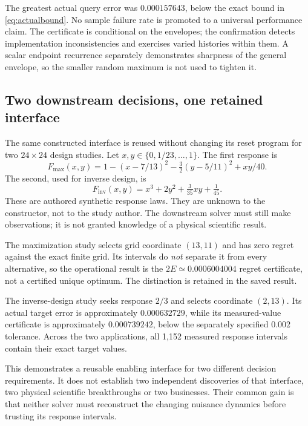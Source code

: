 \documentclass[11pt,letterpaper]{article}
\theoremstyle{definition}\newtheorem{definition}[theorem]{Definition}
\theoremstyle{remark}\newtheorem{remark}[theorem]{Remark}
\begin{document}
The greatest actual query error was $0.000157643$, below the exact bound in \eqref{eq:actualbound}. No sample failure rate is promoted to a universal performance claim. The certificate is conditional on the envelopes; the confirmation detects implementation inconsistencies and exercises varied histories within them. A scalar endpoint recurrence separately demonstrates sharpness of the general envelope, so the smaller random maximum is not used to tighten it.

\subsection{Two downstream decisions, one retained interface}
The same constructed interface is reused without changing its reset program for two $24\times24$ design studies. Let $x,y\in\{0,1/23,\ldots,1\}$. The first response is
\begin{equation}
 F_{\max}(x,y)=1-(x-7/13)^2-\tfrac32(y-5/11)^2+xy/40.
 \label{eq:response1}
\end{equation}
The second, used for inverse design, is
\begin{equation}
 F_{\mathrm{inv}}(x,y)=x^3+2y^2+\tfrac3{35}xy+\tfrac1{45}.
 \label{eq:response2}
\end{equation}
These are authored synthetic response laws. They are unknown to the constructor, not to the study author. The downstream solver must still make observations; it is not granted knowledge of a physical scientific result.

The maximization study selects grid coordinate $(13,11)$ and has zero regret against the exact finite grid. Its intervals do \emph{not} separate it from every alternative, so the operational result is the $2E\simeq0.0006004004$ regret certificate, not a certified unique optimum. The distinction is retained in the saved result.

The inverse-design study seeks response $2/3$ and selects coordinate $(2,13)$. Its actual target error is approximately $0.000632729$, while its measured-value certificate is approximately $0.000739242$, below the separately specified $0.002$ tolerance. Across the two applications, all 1,152 measured response intervals contain their exact target values.

This demonstrates a reusable enabling interface for two different decision requirements. It does not establish two independent discoveries of that interface, two physical scientific breakthroughs or two businesses. Their common gain is that neither solver must reconstruct the changing nuisance dynamics before trusting its response intervals.
\end{document}
